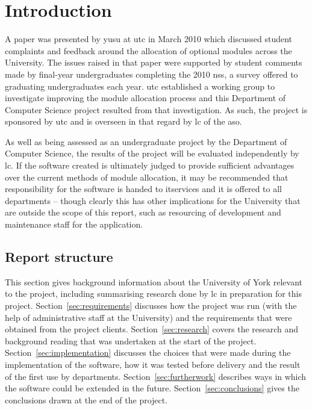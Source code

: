 
\section{Introduction}


A paper was presented by \gls{yusu} at \gls{utc} in March 2010 which discussed
student complaints and feedback around the allocation of optional modules
across the University. The issues raised in that paper were supported by
student comments made by final-year undergraduates completing the 2010
\gls{nss}, a survey offered to graduating undergraduates each year. \gls{utc}
established a working group to investigate improving the module allocation
process and this Department of Computer Science project resulted from that
investigation. As such, the project is sponsored by \gls{utc} and is overseen
in that regard by \gls{lc} of the \gls{aso}.

As well as being assessed as an undergraduate project by the Department of
Computer Science, the results of the project will be evaluated independently
by \gls{lc}. If the software created is ultimately judged to provide
sufficient advantages over the current methods of module allocation, it may be
recommended that responsibility for the software is handed to \gls{itservices}
and it is offered to all departments -- though clearly this has other
implications for the University that are outside the scope of this report,
such as resourcing of development and maintenance staff for the application.

\subsection{Report structure}

This section gives background information about the University of York
relevant to the project, including summarising research done by \gls{lc} in
preparation for this project. Section~\ref{sec:requirements} discusses how the
project was run (with the help of administrative staff at the University) and
the requirements that were obtained from the project clients.
Section~\ref{sec:research} covers the research and background reading that was
undertaken at the start of the project. Section~\ref{sec:implementation}
discusses the choices that were made during the implementation of the
software, how it was tested before delivery and the result of the first use by
departments. Section~\ref{sec:furtherwork} describes ways in which the
software could be extended in the future. Section~\ref{sec:conclusions} gives
the conclusions drawn at the end of the project.

